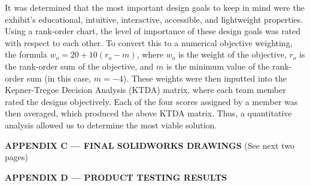 \documentclass[conference]{IEEEtran}
\begin{document}
   \begin{justify}
     It was determined that the most important design goals to keep in mind were the exhibit's educational, intuitive, interactive, accessible, and lightweight properties. Using a rank-order chart, the level of importance of these design goals was rated with respect to each other. To convert this to a numerical objective weighting, the formula $w_o = 20 + 10(r_o - m)$, where $w_o$ is the weight of the objective, $r_o$ is the rank-order sum of the objective, and $m$ is the minimum value of the rank-order sum (in this case, $m=-4$). These weights were then inputted into the Kepner-Tregoe Decision Analysis (KTDA) matrix, where each team member rated the designs objectively. Each of the four scores assigned by a member was then averaged, which produced the above KTDA matrix. Thus, a quantitative analysis allowed us to determine the most viable solution.
   \end{justify} \Large

   \newpage


\hspace{.5in}   \textbf{APPENDIX C — FINAL SOLIDWORKS DRAWINGS}
\normalsize (See next two pages) \Large





 \hspace{.5in}   \textbf{APPENDIX D — PRODUCT TESTING RESULTS}  

 \vspace{10pt}
\end{document}
